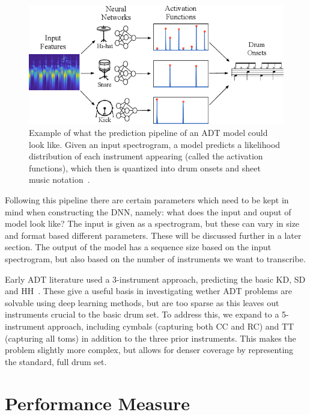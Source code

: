 \begin{figure}[H]
    \centering
    \includegraphics[scale=0.7]{figures/adtpipeline.png}
    \caption{Example of what the prediction pipeline of an \gls{ADT} model could look like. Given an input spectrogram, a model predicts a likelihood distribution of each instrument appearing (called the activation functions), which then is quantized into drum onsets and sheet music notation~\cite{Southall2016AutomaticDT}.}
    \label{ADTFigure}
\end{figure}

Following this pipeline there are certain parameters which need to be kept in mind when constructing the \gls{DNN}, namely: what does the input and ouput of model look like? The input is given as a spectrogram, but these can vary in size and format based different parameters. These will be discussed further in a later section. The output of the model has a sequence size based on the input spectrogram, but also based on the number of instruments we want to transcribe.

Early \gls{ADT} literature used a 3-instrument approach, predicting the basic \acrfull{KD}, \acrfull{SD} and \acrfull{HH}~\cite{vogl2016recurrent}. These give a useful basis in investigating wether \gls{ADT} problems are solvable using deep learning methods, but are too sparse as this leaves out instruments crucial to the basic drum set. To address this, we expand to a 5-instrument approach, including cymbals (capturing both \acrfull{CC} and \acrfull{RC}) and \acrfull{TT} (capturing all toms) in addition to the three prior instruments. This makes the problem slightly more complex, but allows for denser coverage by representing the standard, full drum set.


\section{Performance Measure}

